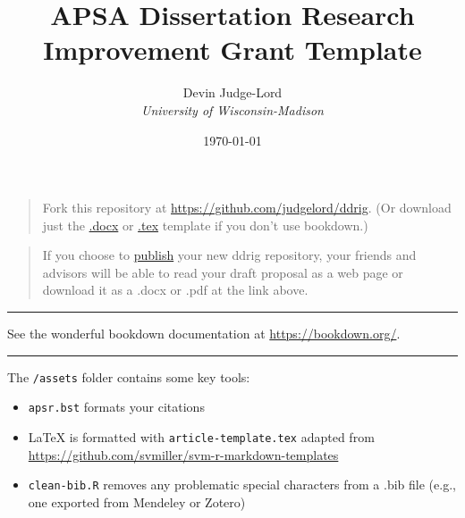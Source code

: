 \documentclass[
      12pt,
        ]{article}
\title{APSA Dissertation Research Improvement Grant Template}
\author{ %
            Devin Judge-Lord  \\ \emph{University of Wisconsin-Madison} 
            }
\date{\today}
\providecommand{\tightlist}{
  \setlength{\itemsep}{0pt}
  \setlength{\parskip}{0pt}
}
\begin{document}
 


  \maketitle













\noindent 
 
   
   
\hypertarget{section}{%
\subsection{}\label{section}}

\begin{quote}
Fork this repository at \url{https://github.com/judgelord/ddrig}. (Or download just the \href{https://judgelord.github.io/ddrig/app.docx}{.docx} or \href{https://judgelord.github.io/ddrig/app.tex}{.tex} template if you don't use bookdown.)
\end{quote}

\begin{quote}
If you choose to \href{https://github.blog/2016-08-17-simpler-github-pages-publishing/}{publish} your new ddrig repository, your friends and advisors will be able to read your draft proposal as a web page or download it as a .docx or .pdf at the link above.
\end{quote}

\begin{center}\rule{0.5\linewidth}{0.5pt}\end{center}

See the wonderful bookdown documentation at \url{https://bookdown.org/}.

\begin{center}\rule{0.5\linewidth}{0.5pt}\end{center}

The \texttt{/assets} folder contains some key tools:

\begin{itemize}
\tightlist
\item
  \texttt{apsr.bst} formats your citations
\item
  LaTeX is formatted with \texttt{article-template.tex} adapted from \url{https://github.com/svmiller/svm-r-markdown-templates}
\item
  \texttt{clean-bib.R} removes any problematic special characters from a .bib file (e.g., one exported from Mendeley or Zotero)
\end{itemize}
\end{document}
